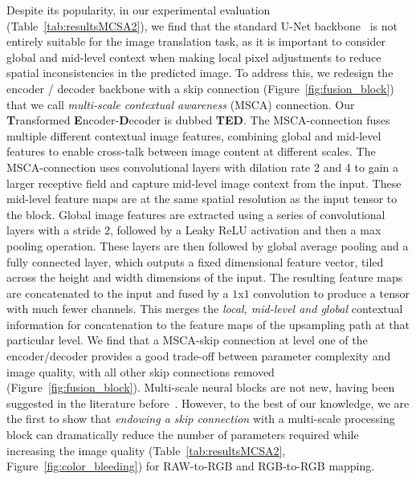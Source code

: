 \documentclass[a4paper,conference]{IEEEtran}
\begin{document}
Despite its popularity, in our experimental evaluation (Table~\ref{tab:resultsMCSA2}), we find that the standard U-Net backbone~\cite{Ronneberger15,Chen2018DPE,Chen2018} is not entirely suitable for the image translation task, as it is important to consider global and mid-level context when making local pixel adjustments to reduce spatial inconsistencies in the predicted image. To address this, we redesign the encoder / decoder backbone with a skip connection (Figure~\ref{fig:fusion_block}) that we call \emph{multi-scale contextual awareness} (MSCA) connection. Our \textbf{T}ransformed \textbf{E}ncoder-\textbf{D}ecoder is dubbed \textbf{TED}. The MSCA-connection fuses multiple different contextual image features, combining global and mid-level features to enable cross-talk between image content at different scales. The MSCA-connection uses convolutional layers with dilation rate 2 and 4 to gain a larger receptive field and capture mid-level image context from the input. These mid-level feature maps are at the same spatial resolution as the input tensor to the block. Global image features are extracted using a series of convolutional layers with a stride 2, followed by a Leaky ReLU activation and then a max pooling operation. These layers are then followed by global average pooling and a fully connected layer, which outputs a fixed dimensional feature vector, tiled across the height and width dimensions of the input. The resulting feature maps are concatenated to the input and fused by a $1$x$1$ convolution to produce a tensor with much fewer channels. This merges the \emph{local, mid-level and global} contextual information for concatenation to the feature maps of the upsampling path at that particular level. We find that a MSCA-skip connection at level one of the encoder/decoder provides a good trade-off between parameter complexity and image quality, with all other skip connections removed (Figure~\ref{fig:fusion_block}). Multi-scale neural blocks are not new, having been suggested in the literature before~\cite{gharbi2017deep,Chen2018,Marnerides18}. However, to the best of our knowledge, we are the first to show that \emph{endowing a skip connection} with a multi-scale processing block can dramatically reduce the number of parameters required while increasing the image quality (Table~\ref{tab:resultsMCSA2}, Figure~\ref{fig:color_bleeding}) for RAW-to-RGB and RGB-to-RGB mapping. 
\end{document}
